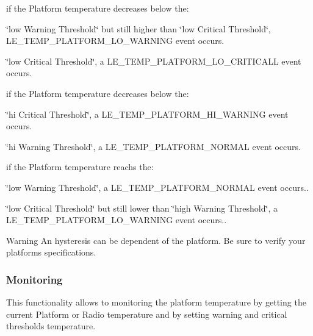 if the Platform temperature decreases below the\+:
\begin{DoxyItemize}
\item \char`\"{}low Warning Threshold\char`\"{} but still higher than \char`\"{}low Critical Threshold\char`\"{}, L\+E\+\_\+\+T\+E\+M\+P\+\_\+\+P\+L\+A\+T\+F\+O\+R\+M\+\_\+\+L\+O\+\_\+\+W\+A\+R\+N\+I\+N\+G event occurs.
\item \char`\"{}low Critical Threshold\char`\"{}, a L\+E\+\_\+\+T\+E\+M\+P\+\_\+\+P\+L\+A\+T\+F\+O\+R\+M\+\_\+\+L\+O\+\_\+\+C\+R\+I\+T\+I\+C\+A\+L\+L event occurs.
\end{DoxyItemize}

if the Platform temperature decreases below the\+:
\begin{DoxyItemize}
\item \char`\"{}hi Critical Threshold\char`\"{}, a L\+E\+\_\+\+T\+E\+M\+P\+\_\+\+P\+L\+A\+T\+F\+O\+R\+M\+\_\+\+H\+I\+\_\+\+W\+A\+R\+N\+I\+N\+G event occurs.
\item \char`\"{}hi Warning Threshold\char`\"{}, a L\+E\+\_\+\+T\+E\+M\+P\+\_\+\+P\+L\+A\+T\+F\+O\+R\+M\+\_\+\+N\+O\+R\+M\+A\+L event occurs.
\end{DoxyItemize}

if the Platform temperature reachs the\+:
\begin{DoxyItemize}
\item \char`\"{}low Warning Threshold\char`\"{}, a L\+E\+\_\+\+T\+E\+M\+P\+\_\+\+P\+L\+A\+T\+F\+O\+R\+M\+\_\+\+N\+O\+R\+M\+A\+L event occurs..
\item \char`\"{}low Critical Threshold\char`\"{} but still lower than \char`\"{}high Warning Threshold\char`\"{}, a L\+E\+\_\+\+T\+E\+M\+P\+\_\+\+P\+L\+A\+T\+F\+O\+R\+M\+\_\+\+L\+O\+\_\+\+W\+A\+R\+N\+I\+N\+G event occurs..
\end{DoxyItemize}

\begin{DoxyWarning}{Warning}
An hysteresis can be dependent of the platform. Be sure to verify your platform\textquotesingle{}s specifications.
\end{DoxyWarning}
\hypertarget{c_temp_Temperature}{}\subsubsection{Monitoring}\label{c_temp_Temperature}
This functionality allows to monitoring the platform temperature by getting the current Platform or Radio temperature and by setting warning and critical thresholds temperature.


